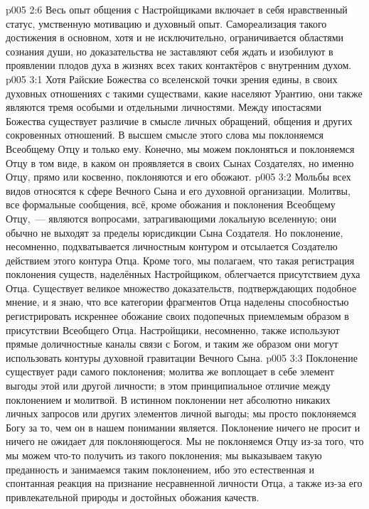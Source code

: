 \vs p005 2:6 Весь опыт общения с Настройщиками включает в себя нравственный статус, умственную мотивацию и духовный опыт. Самореализация такого достижения в основном, хотя и не исключительно, ограничивается областями сознания души, но доказательства не заставляют себя ждать и изобилуют в проявлении плодов духа в жизнях всех таких контактёров с внутренним духом.
\vs p005 3:1 Хотя Райские Божества со вселенской точки зрения едины, в своих духовных отношениях с такими существами, какие населяют Урантию, они также являются тремя особыми и отдельными личностями. Между ипостасями Божества существует различие в смысле личных обращений, общения и других сокровенных отношений. В высшем смысле этого слова мы поклоняемся Всеобщему Отцу и только ему. Конечно, мы можем поклоняться и поклоняемся Отцу в том виде, в каком он проявляется в своих Сынах Создателях, но именно Отцу, прямо или косвенно, поклоняются и его обожают.
\vs p005 3:2 Мольбы всех видов относятся к сфере Вечного Сына и его духовной организации. Молитвы, все формальные сообщения, всё, кроме обожания и поклонения Всеобщему Отцу,~--- являются вопросами, затрагивающими локальную вселенную; они обычно не выходят за пределы юрисдикции Сына Создателя. Но поклонение, несомненно, подхватывается личностным контуром и отсылается Создателю действием этого контура Отца. Кроме того, мы полагаем, что такая регистрация поклонения существ, наделённых Настройщиком, облегчается присутствием духа Отца. Существует великое множество доказательств, подтверждающих подобное мнение, и я знаю, что все категории фрагментов Отца наделены способностью регистрировать искреннее обожание своих подопечных приемлемым образом в присутствии Всеобщего Отца. Настройщики, несомненно, также используют прямые доличностные каналы связи с Богом, и таким же образом они могут использовать контуры духовной гравитации Вечного Сына.
\vs p005 3:3 Поклонение существует ради самого поклонения; молитва же воплощает в себе элемент выгоды этой или другой личности; в этом принципиальное отличие между поклонением и молитвой. В истинном поклонении нет абсолютно никаких личных запросов или других элементов личной выгоды; мы просто поклоняемся Богу за то, чем он в нашем понимании является. Поклонение ничего не просит и ничего не ожидает для поклоняющегося. Мы не поклоняемся Отцу из\hyp{}за того, что мы можем что\hyp{}то получить из такого поклонения; мы выказываем такую преданность и занимаемся таким поклонением, ибо это естественная и спонтанная реакция на признание несравненной личности Отца, а также из\hyp{}за его привлекательной природы и достойных обожания качеств.
